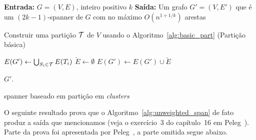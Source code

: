 \begin{algorithm}
  \LinesNumbered
  \textbf{Entrada:} {$G=(V,E)$, inteiro positivo $k$}\;
  \textbf{Saída:} {Um grafo $G'=(V,E')$ que é um $(2k-1)$-spanner de $G$ com no máximo $O(n^{1 + 1/k})$ arestas}\;
  
  \BlankLine
  Construir uma partição $\mathcal{T}$ de $V$ usando o Algoritmo~\ref{alg:basic_part} (Partição básica)\;

  $E(G') \gets \bigcup_{S_i \in \mathcal{T}}E(T_i)$\;
  $\breve{E} \gets \emptyset$\;
  $E(G') \gets E(G') \cup \breve{E}$\;

  \Return $G'$.
  \caption{spanner baseado em partição em \emph{clusters}} 
  \label{alg:unweighted_span}
\end{algorithm}

\bigskip

O seguinte resultado prova que o Algoritmo~\ref{alg:unweighted_span}
de fato produz a saída que mencionamos (veja o exercício~3 do
  capítulo~16 em Peleg~\cite{Peleg2000}). Parte da prova foi apresentada por 
Peleg~\cite{Peleg2000}, a parte omitida segue abaixo.


